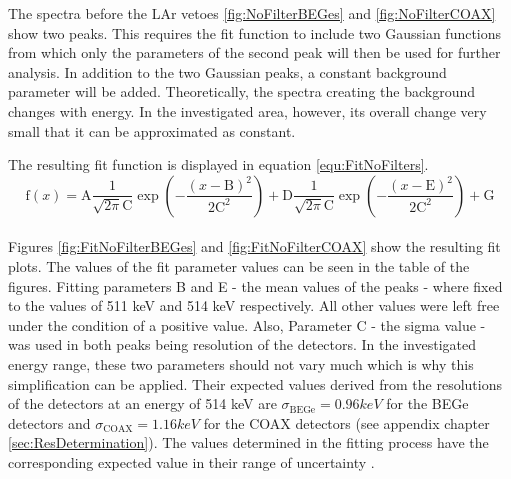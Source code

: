 \documentclass[encoding=utf8,british]{tumphthesis}
\begin{document}
The spectra before the LAr vetoes \ref{fig:NoFilterBEGes} and \ref{fig:NoFilterCOAX} show two peaks.
This requires the fit function to include two Gaussian functions from which only the parameters of the second peak will then be used for further analysis.
In addition to the two Gaussian peaks, a constant background parameter will be added.
Theoretically, the  spectra creating the background changes with energy.
In the investigated area, however, its overall change very small that it can be approximated as constant. 

The resulting fit function is displayed in equation \ref{equ:FitNoFilters}.
\\

\begin{equation}
\mathrm{f}(x) = \mathrm{A}\frac{1}{\sqrt{2\pi}\mathrm{C}}\exp\left(-\frac{(x-\mathrm{B})^2}{2\mathrm{C}^2}\right) + \mathrm{D}\frac{1}{\sqrt{2\pi}\mathrm{C}}\exp\left(-\frac{(x-\mathrm{E})^2}{2\mathrm{C}^2}\right) + \mathrm{G}
\label{equ:FitNoFilters}
\end{equation}
\\

Figures \ref{fig:FitNoFilterBEGes} and \ref{fig:FitNoFilterCOAX} show the resulting fit plots.
The values of the fit parameter values can be seen in the table of the figures.
Fitting parameters B and E - the mean values of the peaks - where fixed to the values of 511 keV and 514 keV respectively.
All other values were left free under the condition of a positive value.
Also, Parameter C - the sigma value - was used in both peaks being resolution of the detectors.
In the investigated energy range, these two parameters should not vary much which is why this simplification can be applied.
Their expected values derived from the resolutions of the detectors at an energy of 514 keV are $\sigma_{\mathrm{BEGe}} = 0.96 \unit{keV}$ for the BEGe detectors and  $\sigma_{\mathrm{COAX}} = 1.16 \unit{keV}$ for the COAX detectors (see appendix chapter \ref{sec:ResDetermination}).
The values determined in the fitting process have the corresponding expected value in their range of uncertainty .
\\
\end{document}
